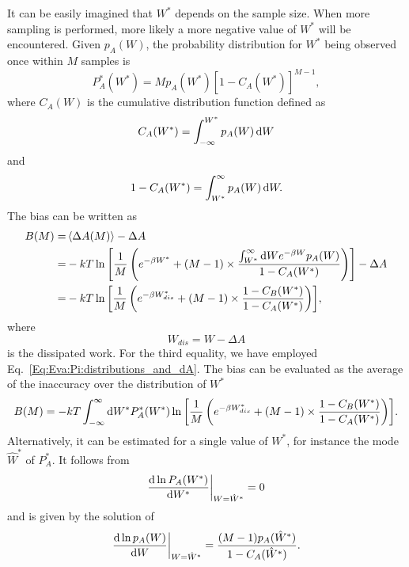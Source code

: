It can be easily imagined that $W^\ast$ depends on the sample size. When more sampling is performed, more likely a more negative value of $W^\ast$ will be encountered. Given $p_A(W)$, the probability distribution for $W^\ast$ being observed once within $M$ samples is
\begin{equation}
    P_A^\ast(W^\ast)=Mp_A(W^\ast)[1-C_A(W^\ast)]^{M-1},
    \label{Eq:Eva:Pi:prob_of_Wstar}
\end{equation}
where $C_A(W)$ is the cumulative distribution function defined as
\begin{equation}
    C_A(W^\ast)=\int_{-\infty}^{W^\ast} p_A(W)\mathop{}\!\mathrm{d} W
\end{equation}
and
\begin{equation}
    1-C_A(W^\ast)=\int_{W^\ast}^{\infty} p_A(W)\mathop{}\!\mathrm{d} W.
\end{equation}
The bias can be written as
\begin{align}
    B(M)=&\left<\Delta A(M)\right>-\Delta A\notag\\
        =&-kT\ln{\left[\frac{1}{M}\left(e^{-\beta W^\ast}+(M-1)\times \frac{\int_{W^\ast}^{\infty}\mathop{}\!\mathrm{d}We^{-\beta W}p_A(W)}{1-C_A(W^\ast)}\right)\right]}-
        \Delta A\notag\\
        =&-kT\ln{\left[\frac{1}{M}\left(e^{-\beta W^\ast_{dis}}+(M-1)\times \frac{1-C_B(W^\ast)}{1-C_A(W^\ast)}\right)\right]},
        \label{Eq:Eva:Pi:bias}
\end{align}
where
\begin{equation}
    W_{dis}=W-\Delta A
\end{equation}
is the dissipated work. For the third equality, we have employed Eq.~\ref{Eq:Eva:Pi:distributions_and_dA}. The bias can be evaluated as the average of the inaccuracy over the distribution of $W^\ast$
\begin{equation}
    B(M)=-kT\int_{-\infty}^\infty\mathop{}\!\mathrm{d} W^\ast P_A^\ast(W^\ast)\ln{\left[\frac{1}{M}\left(e^{-\beta W^\ast_{dis}}+(M-1)\times \frac{1-C_B(W^\ast)}{1-C_A(W^\ast)}\right)\right]}.
\end{equation}
Alternatively, it can be estimated for a single value of $W^\ast$, for instance the mode $\hat{W}^\ast$ of $P_A^\ast$. It follows from  
\begin{equation}
    \frac{\mathop{}\!\mathrm{d} \ln{P_A(W^\ast)}}{\mathop{}\!\mathrm{d} W^\ast}\biggr\rvert_{W=\hat{W}^\ast}=0
\end{equation}
and is given by the solution of
\begin{equation}
    \frac{\mathop{}\!\mathrm{d} \ln{p_A(W)}}{\mathop{}\!\mathrm{d} W}\biggr\rvert_{W=\hat{W}^\ast}=\frac{(M-1)p_A(\hat{W}^\ast)}{1-C_A(\hat{W}^\ast)}.
    \label{Eq:Eva:Pi:Wmax}
\end{equation}
